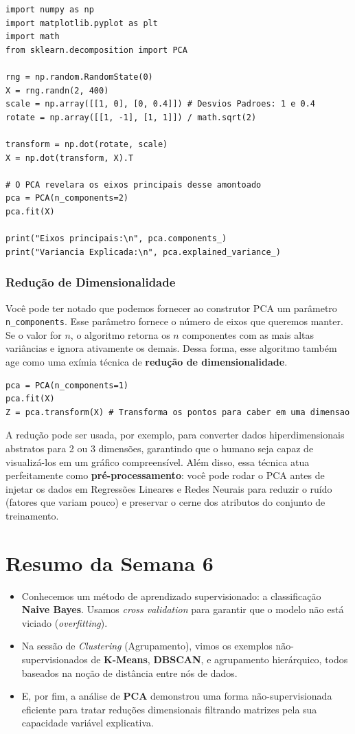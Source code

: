 \documentclass[11pt,a4paper]{article}
\begin{document}
\begin{lstlisting}
import numpy as np
import matplotlib.pyplot as plt
import math
from sklearn.decomposition import PCA

rng = np.random.RandomState(0)
X = rng.randn(2, 400)
scale = np.array([[1, 0], [0, 0.4]]) # Desvios Padroes: 1 e 0.4
rotate = np.array([[1, -1], [1, 1]]) / math.sqrt(2)

transform = np.dot(rotate, scale)
X = np.dot(transform, X).T

# O PCA revelara os eixos principais desse amontoado
pca = PCA(n_components=2)
pca.fit(X)

print("Eixos principais:\n", pca.components_)
print("Variancia Explicada:\n", pca.explained_variance_)
\end{lstlisting}

\subsubsection{Redução de Dimensionalidade}

Você pode ter notado que podemos fornecer ao construtor PCA um parâmetro \texttt{n\_components}. Esse parâmetro fornece o número de eixos que queremos manter. Se o valor for $n$, o algoritmo retorna os $n$ componentes com as mais altas variâncias e ignora ativamente os demais. Dessa forma, esse algoritmo também age como uma exímia técnica de \textbf{redução de dimensionalidade}.

\begin{lstlisting}
pca = PCA(n_components=1)
pca.fit(X)
Z = pca.transform(X) # Transforma os pontos para caber em uma dimensao
\end{lstlisting}

A redução pode ser usada, por exemplo, para converter dados hiperdimensionais abstratos para 2 ou 3 dimensões, garantindo que o humano seja capaz de visualizá-los em um gráfico compreensível. Além disso, essa técnica atua perfeitamente como \textbf{pré-processamento}: você pode rodar o PCA antes de injetar os dados em Regressões Lineares e Redes Neurais para reduzir o ruído (fatores que variam pouco) e preservar o cerne dos atributos do conjunto de treinamento.

\section{Resumo da Semana 6}

\begin{itemize}
    \item Conhecemos um método de aprendizado supervisionado: a classificação \textbf{Naive Bayes}. Usamos \textit{cross validation} para garantir que o modelo não está viciado (\emph{overfitting}).
    \item Na sessão de \emph{Clustering} (Agrupamento), vimos os exemplos não-supervisionados de \textbf{K-Means}, \textbf{DBSCAN}, e agrupamento hierárquico, todos baseados na noção de distância entre nós de dados.
    \item E, por fim, a análise de \textbf{PCA} demonstrou uma forma não-supervisionada eficiente para tratar reduções dimensionais filtrando matrizes pela sua capacidade variável explicativa.
\end{itemize}
\end{document}
